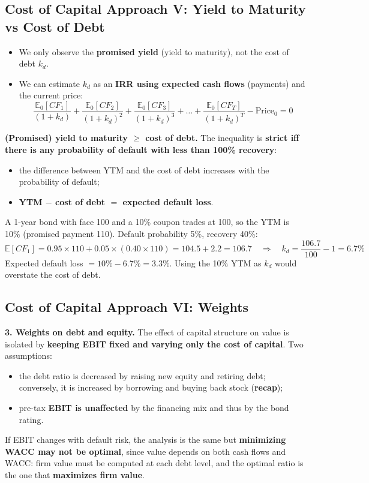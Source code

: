 \subsection[Cost of Capital Approach V: Yield to Maturity vs Cost of Debt]{Cost of Capital Approach V: Yield to Maturity vs Cost of Debt }

\begin{itemize}
  \item We only observe the \textbf{promised yield} (yield to maturity), not the cost of debt $k_d$.
  \item We can estimate $k_d$ as an \textbf{IRR using expected cash flows} (payments) and the current price:
  \[
  \frac{\mathbb{E}_0[CF_1]}{(1+k_d)}+\frac{\mathbb{E}_0[CF_2]}{(1+k_d)^2}+\frac{\mathbb{E}_0[CF_3]}{(1+k_d)^3}+\dots+\frac{\mathbb{E}_0[CF_T]}{(1+k_d)^T}-\text{Price}_0=0
  \]
\end{itemize}
\begin{keybox}
\textbf{(Promised) yield to maturity $\geq$ cost of debt.} The inequality is \textbf{strict iff there is any probability of default with less than 100\% recovery}:
\begin{itemize}[leftmargin=*]
  \item the difference between YTM and the cost of debt increases with the probability of default;
  \item \textbf{YTM $-$ cost of debt $=$ expected default loss}.
\end{itemize}
\end{keybox}
\begin{exbox}
A 1-year bond with face 100 and a 10\% coupon trades at 100, so the YTM is 10\% (promised payment 110). Default probability 5\%, recovery 40\%:
\[
\mathbb{E}[CF_1]=0.95\times110+0.05\times(0.40\times110)=104.5+2.2=106.7\quad\Rightarrow\quad k_d=\frac{106.7}{100}-1=6.7\%
\]
Expected default loss $=10\%-6.7\%=3.3\%$. Using the 10\% YTM as $k_d$ would overstate the cost of debt.
\end{exbox}

\subsection[Cost of Capital Approach VI: Weights]{Cost of Capital Approach VI: Weights }

\textbf{3. Weights on debt and equity.} The effect of capital structure on value is isolated by \textbf{keeping EBIT fixed and varying only the cost of capital}. Two assumptions:
\begin{itemize}
  \item the debt ratio is decreased by raising new equity and retiring debt; conversely, it is increased by borrowing and buying back stock (\textbf{recap});
  \item pre-tax \textbf{EBIT is unaffected} by the financing mix and thus by the bond rating.
\end{itemize}
If EBIT changes with default risk, the analysis is the same but \textbf{minimizing WACC may not be optimal}, since value depends on both cash flows and WACC: firm value must be computed at each debt level, and the optimal ratio is the one that \textbf{maximizes firm value}.

